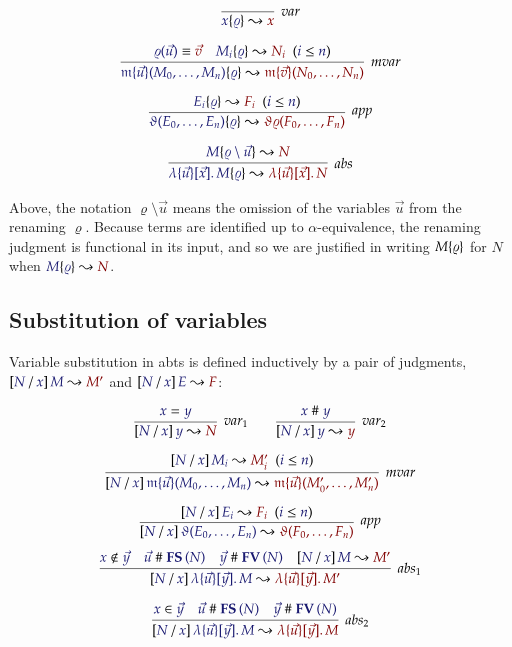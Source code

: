 \documentclass[11pt]{article}
\theoremstyle{definition}
\theoremstyle{remark}
\numberwithin{equation}{section}
\begin{document}
\begin{gather*}
  \infer[\textit{var}]{
    \IsRenaming{\varrho}{x}{x}
  }{
  }
\\[6pt]
  \infer[\textit{mvar}]{
    \IsRenaming{\varrho}{
      \MApp{\MV{m}}{\vec{u}}{M_0,\dots,M_n}
    }{
      \MApp{\MV{m}}{\vec{v}}{N_0,\dots,N_n}
    }
  }{
    \Match{\varrho(\vec{u})}{\vec{v}}
&
    \HypJ{
      \IsRenaming{\varrho}{M_i}{N_i}
    }{
      \Leq{i}{n}
    }
  }
\\[6pt]
  \infer[\textit{app}]{
    \IsRenaming{\varrho}{
      \App{\vartheta}{E_0,\dots,E_n}
    }{
      \App{\vartheta\varrho}{F_0,\dots,F_n}
    }
  }{
    \HypJ{
      \IsRenaming{\varrho}{E_i}{F_i}
    }{
      \Leq{i}{n}
    }
  }
\\[6pt]
  \infer[\textit{abs}]{
    \IsRenaming{\varrho}{
      \MkBTm{\vec{u}}{\vec{x}}{M}
    }{
      \MkBTm{\vec{u}}{\vec{x}}{N}
    }
  }{
    \IsRenaming{\varrho\setminus\vec{u}}{M}{N}
  }
\end{gather*}

Above, the notation $\varrho\setminus\vec{u}$ means the omission of the
variables $\vec{u}$ from the renaming $\varrho$. Because terms are identified up
to $\alpha$-equivalence, the renaming judgment is functional in its input, and
so we are justified in writing $M\{\varrho\}$ for $N$ when
$\IsRenaming{\varrho}{M}{N}$.

\subsection{Substitution of variables}

Variable substitution in abts is defined inductively by a pair of judgments,
$\IsSubst{N}{x}{M}{M'}$ and $\IsSubst{N}{x}{E}{F}$:

\begin{gather*}
  \infer[\textit{var}_1]{
    \IsSubst{N}{x}{y}{N}
  }{
    \IsEq{x}{y}
  }
\qquad
  \infer[\textit{var}_2]{
    \IsSubst{N}{x}{y}{y}
  }{
    \IsApart{x}{y}
  }
\\[6pt]
  \infer[\textit{mvar}]{
    \IsSubst{N}{x}{
      \MApp{\MV{m}}{\vec{u}}{M_0,\dots,M_n}
    }{
      \MApp{\MV{m}}{\vec{u}}{M'_0,\dots,M'_n}
    }
  }{
    \HypJ{
      \IsSubst{N}{x}{M_i}{M'_i}
    }{
      \Leq{i}{n}
    }
  }
\\[6pt]
  \infer[\textit{app}]{
    \IsSubst{N}{x}{
      \App{\vartheta}{E_0,\dots,E_n}
    }{
      \App{\vartheta}{F_0,\dots,F_n}
    }
  }{
    \HypJ{
      \IsSubst{N}{x}{E_i}{F_i}
    }{
      \Leq{i}{n}
    }
  }
\end{gather*}
\begin{gather*}
  \infer[\textit{abs}_1]{
    \IsSubst{N}{x}{
      \MkBTm{\vec{u}}{\vec{y}}{M}
    }{
      \MkBTm{\vec{u}}{\vec{y}}{M'}
    }
  }{
    \NotIn{x}{\vec{y}}
&
    \IsApart{\vec{u}}{\FS{N}}
&
    \IsApart{\vec{y}}{\FV{N}}
&
    \IsSubst{N}{x}{M}{M'}
  }
\\[6pt]
  \infer[\textit{abs}_2]{
    \IsSubst{N}{x}{
      \MkBTm{\vec{u}}{\vec{y}}{M}
    }{
      \MkBTm{\vec{u}}{\vec{y}}{M}
    }
  }{
    \Member{x}{\vec{y}}
&
    \IsApart{\vec{u}}{\FS{N}}
&
    \IsApart{\vec{y}}{\FV{N}}
  }
\end{gather*}
\end{document}
